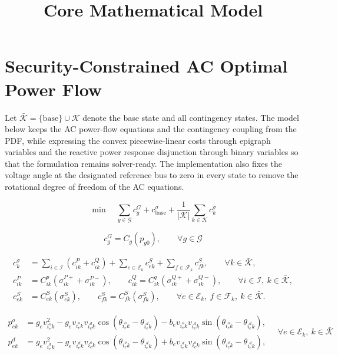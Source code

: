 \documentclass{article}
\title{Core Mathematical Model}
\date{}
\begin{document}
\maketitle

\section*{Security-Constrained AC Optimal Power Flow}

Let $\bar{\mathcal{K}} = \{\text{base}\} \cup \mathcal{K}$ denote the base state
and all contingency states. The model below keeps the AC power-flow equations and
the contingency coupling from the PDF, while expressing the convex piecewise-linear
costs through epigraph variables and the reactive power response disjunction through
binary variables so that the formulation remains solver-ready. The implementation
also fixes the voltage angle at the designated reference bus to zero in every state
to remove the rotational degree of freedom of the AC equations.

\begin{equation}
\min \quad
\sum_{g \in \mathcal{G}} c_g^G
+ c_{\text{base}}^\sigma
+ \frac{1}{|\mathcal{K}|} \sum_{k \in \mathcal{K}} c_k^\sigma
\tag{2.1a}
\end{equation}

\begin{equation}
c_g^G = C_g(p_{g0}),
\qquad \forall g \in \mathcal{G}
\tag{2.1a$'$}
\end{equation}

\begin{equation}
\begin{aligned}
c_k^\sigma &=
\sum_{i \in \mathcal{I}}
\left(
c_{ik}^{P} + c_{ik}^{Q}
\right)
+ \sum_{e \in \mathcal{E}_k} c_{ek}^{S}
+ \sum_{f \in \mathcal{F}_k} c_{fk}^{S},
\qquad \forall k \in \bar{\mathcal{K}}, \\
c_{ik}^{P} &= C_{ik}^{p}(\sigma_{ik}^{P+} + \sigma_{ik}^{P-}),
\qquad
c_{ik}^{Q} = C_{ik}^{q}(\sigma_{ik}^{Q+} + \sigma_{ik}^{Q-}),
\qquad \forall i \in \mathcal{I},\ k \in \bar{\mathcal{K}}, \\
c_{ek}^{S} &= C_{ek}^{S}(\sigma_{ek}^{S}),
\qquad
c_{fk}^{S} = C_{fk}^{S}(\sigma_{fk}^{S}),
\qquad \forall e \in \mathcal{E}_k,\ f \in \mathcal{F}_k,\ k \in \bar{\mathcal{K}}.
\end{aligned}
\tag{2.1b}
\end{equation}

\begin{equation}
\begin{aligned}
p_{ek}^o &=
g_e v_{i_e^o k}^2
- g_e v_{i_e^o k} v_{i_e^d k} \cos(\theta_{i_e^o k} - \theta_{i_e^d k})
- b_e v_{i_e^o k} v_{i_e^d k} \sin(\theta_{i_e^o k} - \theta_{i_e^d k}), \\
p_{ek}^d &=
g_e v_{i_e^d k}^2
- g_e v_{i_e^d k} v_{i_e^o k} \cos(\theta_{i_e^o k} - \theta_{i_e^d k})
+ b_e v_{i_e^d k} v_{i_e^o k} \sin(\theta_{i_e^o k} - \theta_{i_e^d k}),
\end{aligned}
\quad \forall e \in \mathcal{E}_k,\ k \in \bar{\mathcal{K}}
\tag{2.1c}
\end{equation}
\end{document}
